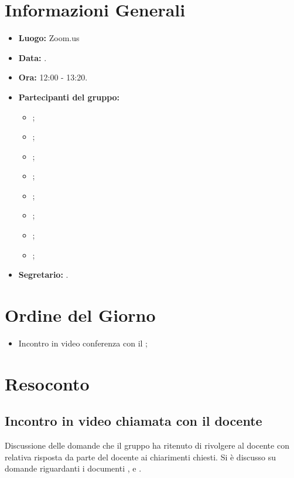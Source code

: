   
\section{Informazioni Generali}
\begin{itemize}
	\item \textbf{Luogo:} Zoom.us
	\item \textbf{Data:} \Data.
	\item \textbf{Ora:} 12:00 - 13:20.
	\item \textbf{Partecipanti del gruppo:}
	\begin{itemize}
		\item \AT{};
		\item \BR{};  
		\item \CE{}; 
		\item \DF{};
		\item \LD{};
		\item \MC{};
		\item \PF{};
		\item \SE{};
	\end{itemize} 
	\item \textbf{Segretario:} \BR{}.
\end{itemize}

\section{Ordine del Giorno}
\begin{itemize}
	\item Incontro in video conferenza con il \VT{};
\end{itemize}

\section{Resoconto}

\subsection{Incontro in video chiamata con il docente}
Discussione delle domande che il gruppo ha ritenuto di rivolgere al docente con relativa risposta da parte del docente ai chiarimenti chiesti. Si è discusso su domande riguardanti i documenti \PdP, \NdP e \PdQ.

\clearpage
